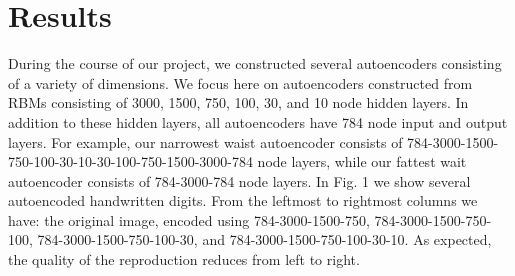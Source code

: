 \documentclass{article}
\begin{document}
\section{Results}\label{sec:results}

During the course of our project, we constructed several autoencoders consisting of a variety of dimensions. We focus here on autoencoders constructed from RBMs consisting of 3000, 1500, 750, 100, 30, and 10 node hidden layers. In addition to these hidden layers, all autoencoders have 784 node input and output layers. For example, our narrowest waist autoencoder consists of 784-3000-1500-750-100-30-10-30-100-750-1500-3000-784 node layers, while our fattest wait autoencoder consists of 784-3000-784 node layers. In Fig. 1 we show several autoencoded handwritten digits. From the leftmost to rightmost columns we have: the original image, encoded using 784-3000-1500-750, 784-3000-1500-750-100, 784-3000-1500-750-100-30, and 784-3000-1500-750-100-30-10. As expected, the quality of the reproduction reduces from left to right.
\end{document}
